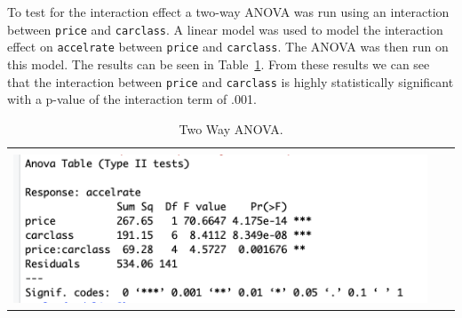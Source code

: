 \documentclass[acmsmall]{acmart}
\begin{document}
To test for the interaction effect a two-way ANOVA was run using an interaction between \texttt{price} and \texttt{carclass}. A linear model was used to model the interaction effect on \texttt{accelrate} between \texttt{price} and \texttt{carclass}. The ANOVA was then run on this model. The results can be seen in Table~\ref{fig:TWATAB}. From these results we can see that the interaction between \texttt{price} and \texttt{carclass} is highly statistically significant with a p-value of the interaction term of .001.
\begin{table}[h]
\centering
\begin{tabular}{| p{}|}
	\hline
	\\
	\includegraphics[width=0.95\textwidth]{../graphics/TWATable}\\
	\hline
	\end{tabular}	
	\caption{Two Way ANOVA.} %
	\label{fig:TWATAB}
\end{table}
\end{document}
